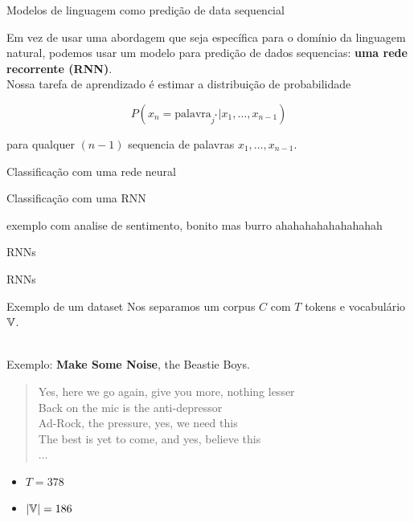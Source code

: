 \documentclass[10pt]{beamer}
\begin{document}
\begin{frame}{Modelos de linguagem como predição de data sequencial}

Em vez de usar uma abordagem que seja específica para o domínio da linguagem natural, podemos usar um modelo para predição de dados sequencias:  \textbf{uma rede recorrente (RNN)}. \\

Nossa tarefa de aprendizado é estimar a distribuição de probabilidade

\[
P(x_{n} = \text{palavra}_{j^{*}} | x_{1}, \dots ,x_{n-1})
\]

para qualquer $(n-1)$ sequencia de palavras $x_{1}, \dots ,x_{n-1}$.
\end{frame}

\begin{frame}{Classificação com uma rede neural}

\end{frame}

\begin{frame}{Classificação com uma RNN}

exemplo com analise de sentimento,
bonito mas burro ahahahahahahahahah
\end{frame}

\begin{frame}[fragile]{RNNs}

\end{frame}


\begin{frame}[fragile]{RNNs}

\end{frame}



\begin{frame}{Exemplo de um dataset}
Nos separamos um corpus $C$ com $T$ tokens e vocabulário $\mathbb{V}$.\\\

Exemplo: \textbf{Make Some Noise}, the Beastie Boys.\\

\begin{quote}
\alert{Yes, here we go again, give you more, nothing lesser\\
Back on the mic is the anti-depressor\\
Ad-Rock, the pressure, yes, we need this\\
The best is yet to come, and yes, believe this\\
... \\}
\end{quote}

\begin{itemize}
\item $T = 378$
\item $|\mathbb{V}| = 186$
\end{itemize}

\end{frame}
\end{document}
